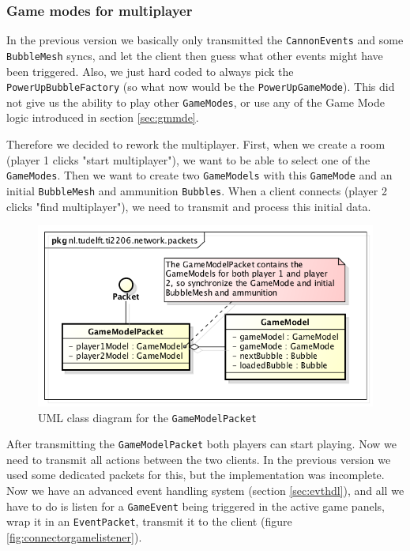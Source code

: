 \documentclass[a4paper]{article}
\begin{document}
\subsubsection{Game modes for multiplayer}
In the previous version we basically only transmitted the \texttt{CannonEvents} and some \texttt{BubbleMesh} syncs, and let the client then guess what other events might have been triggered. Also, we just hard coded to always pick the \texttt{PowerUpBubbleFactory} (so what now would be the \texttt{PowerUpGameMode}). This did not give us the ability to play other \texttt{GameModes}, or use any of the Game Mode logic introduced in section \ref{sec:gmmde}.

\par{}Therefore we decided to rework the multiplayer. First, when we create a room (player 1 clicks "start multiplayer"), we want to be able to select one of the \texttt{GameModes}. Then we want to create two \texttt{GameModels} with this \texttt{GameMode} and an initial \texttt{BubbleMesh} and ammunition \texttt{Bubbles}. When a client connects (player 2 clicks "find multiplayer"), we need to transmit and process this initial data.

\begin{figure}[H]
	\centering
	\includegraphics[scale=0.5]{GameModelPacket.png}
    \caption{UML class diagram for the \texttt{GameModelPacket} }
    \label{fig:gmpacket}
\end{figure}

After transmitting the \texttt{GameModelPacket} both players can start playing. Now we need to transmit all actions between the two clients. In the previous version we used some dedicated packets for this, but the implementation was incomplete. Now we have an advanced event handling system (section \ref{sec:evthdl}), and all we have to do is listen for a \texttt{GameEvent} being triggered in the active game panels, wrap it in an \texttt{EventPacket}, transmit it to the client (figure \ref{fig:connectorgamelistener}).
\end{document}

